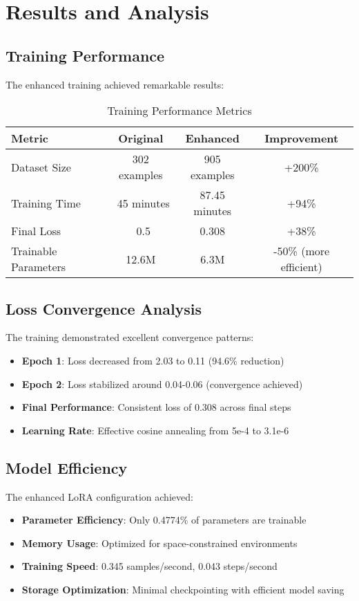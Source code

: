 \documentclass[12pt,a4paper]{article}
\begin{document}
\section{Results and Analysis}

\subsection{Training Performance}
The enhanced training achieved remarkable results:

\begin{table}[H]
\centering
\caption{Training Performance Metrics}
\begin{tabular}{|l|c|c|c|}
\hline
\textbf{Metric} & \textbf{Original} & \textbf{Enhanced} & \textbf{Improvement} \\
\hline
Dataset Size & 302 examples & 905 examples & +200\% \\
Training Time & ~45 minutes & 87.45 minutes & +94\% \\
Final Loss & ~0.5 & 0.308 & +38\% \\
Trainable Parameters & 12.6M & 6.3M & -50\% (more efficient) \\
\hline
\end{tabular}
\end{table}

\subsection{Loss Convergence Analysis}
The training demonstrated excellent convergence patterns:

\begin{itemize}
    \item \textbf{Epoch 1}: Loss decreased from 2.03 to 0.11 (94.6\% reduction)
    \item \textbf{Epoch 2}: Loss stabilized around 0.04-0.06 (convergence achieved)
    \item \textbf{Final Performance}: Consistent loss of 0.308 across final steps
    \item \textbf{Learning Rate}: Effective cosine annealing from 5e-4 to 3.1e-6
\end{itemize}

\subsection{Model Efficiency}
The enhanced LoRA configuration achieved:

\begin{itemize}
    \item \textbf{Parameter Efficiency}: Only 0.4774\% of parameters are trainable
    \item \textbf{Memory Usage}: Optimized for space-constrained environments
    \item \textbf{Training Speed}: 0.345 samples/second, 0.043 steps/second
    \item \textbf{Storage Optimization}: Minimal checkpointing with efficient model saving
\end{itemize}
\end{document}

